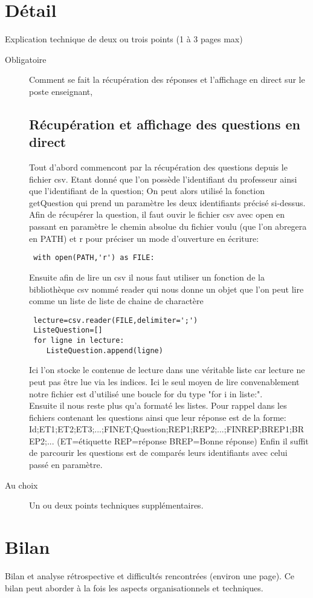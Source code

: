 \documentclass[a4paper, 12pt]{article}
\begin{document}
    
\section{Détail}

Explication technique de deux ou trois points (1 à 3 pages max)
\begin{description}
\item[Obligatoire] Comment se fait la récupération des réponses et l'affichage
en direct sur le poste enseignant,

\subsection{Récupération et affichage des questions en direct}

Tout d'abord commencont par la récupération des questions depuis le fichier 
csv. Etant donné que l'on possède l'identifiant du professeur ainsi que 
l'identifiant de la question; On peut alors utilisé la fonction getQuestion qui
prend un paramètre
les deux identifiants précisé si-dessus. Afin de récupérer la question, il faut
ouvir le fichier csv avec open en passant en paramètre le chemin absolue du
fichier voulu (que l'on abregera en PATH) et r pour préciser un mode d'ouverture
en écriture: 
\begin{lstlisting}
 with open(PATH,'r') as FILE:
\end{lstlisting}
Ensuite afin de lire un csv il nous faut utiliser un fonction de la bibliothèque
csv nommé reader qui nous donne un objet que l'on peut lire comme un liste de 
liste de chaine de charactère
\begin{lstlisting}
 lecture=csv.reader(FILE,delimiter=';')
 ListeQuestion=[]
 for ligne in lecture:
    ListeQuestion.append(ligne)
\end{lstlisting}
Ici l'on stocke le contenue de lecture dans une véritable liste car lecture
ne peut pas être lue via les indices. Ici le seul moyen de lire convenablement
notre fichier est d'utilisé une boucle for du type "for i in liste:". \\
Ensuite il nous reste plus qu'a formaté les listes. Pour rappel dans les 
fichiers contenant les questions ainsi que leur réponse est de la forme:\\
Id;ET1;ET2;ET3;...;FINET;Question;REP1;REP2;...;FINREP;BREP1;BREP2;...
(ET=étiquette REP=réponse BREP=Bonne réponse)
Enfin il suffit de parcourir les questions est de comparés leurs identifiants 
avec celui passé en paramètre. 

\item[Au choix] Un ou deux  points techniques supplémentaires.  
\end{description}

\section{Bilan}

Bilan et analyse rétrospective et difficultés rencontrées (environ une page). 
Ce bilan peut aborder à la fois les aspects organisationnels et techniques.

    
\end{document}
